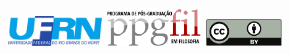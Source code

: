 \begin{figure}[b]
  \begin{minipage}{0.33\textwidth}
     \includegraphics[width=2.5cm, left]{./assets/logo-ufrn-flat}
  \end{minipage}%
  \begin{minipage}{0.33\textwidth}
     \centering
     \includegraphics[width=2.5cm]{./assets/ppgfil-logo}
  \end{minipage}
  \begin{minipage}{0.33\textwidth}
     \centering
     \includegraphics[width=2cm]{./assets/by}
  \end{minipage}%
\end{figure}

\newpage

\thispagestyle{empty}
\onecolumn
\ 
\vfill

